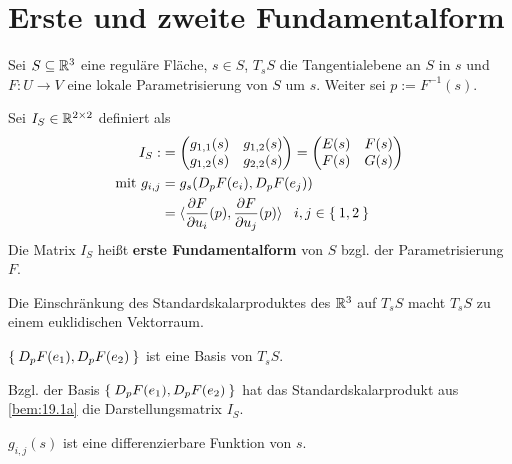 \section{Erste und zweite Fundamentalform}%
Sei $S \subseteq \mathbb{R}^3$ eine reguläre Fläche, $s \in S$, $T_s S$ die Tangentialebene
an $S$ in $s$ und $F: U \rightarrow V$ eine lokale Parametrisierung von $S$ um
$s$. Weiter sei $p := F^{-1}(s)$.

\begin{definition}%
  Sei $I_S \in \mathbb{R}^{2 \times 2}$ definiert als
      \begin{align*}
        I_S :&= \begin{pmatrix}
                  g_{1,1}(s) & g_{1,2}(s)\\
                  g_{1,2}(s) & g_{2,2}(s)
               \end{pmatrix} =
               \begin{pmatrix}
                  E(s) & F(s) \\
                  F(s) & G(s)
               \end{pmatrix}\\
\text{mit } g_{i,j} &= g_s(D_p F(e_i), D_p F(e_j))\\
              &= \langle \frac{\partial F}{\partial u_i} (p), \frac{\partial F}{\partial u_j} (p) \rangle \;\;\; i,j \in \Set{1,2}
      \end{align*}
      Die Matrix $I_S$ heißt \textbf{erste Fundamentalform}
      von $S$ bzgl. der Parametrisierung $F$.
\end{definition}

\begin{bemerkung}%
    \begin{bemenum}
        \item \label{bem:19.1a} Die Einschränkung des Standardskalarproduktes des $\mathbb{R}^3$ auf
              $T_s S$ macht $T_s S$ zu einem euklidischen Vektorraum.
        \item $\Set{D_p F(e_1), D_p F(e_2)}$ ist eine Basis von $T_s S$.
        \item Bzgl. der Basis $\Set{D_p F(e_1), D_p F(e_2)}$ hat das 
              Standardskalarprodukt aus \cref{bem:19.1a} die Darstellungsmatrix
              $I_S$.
        \item $g_{i,j}(s)$ ist eine differenzierbare Funktion von $s$.
    \end{bemenum}
\end{bemerkung}

